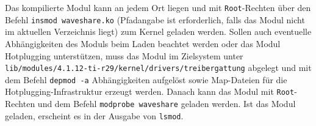 
Das kompilierte Modul kann an jedem Ort liegen und mit \texttt{Root}-Rechten über den Befehl \texttt{insmod waveshare.ko} (Pfadangabe ist erforderlich, falls das Modul nicht im aktuellen Verzeichnis liegt) zum Kernel geladen werden. Sollen auch eventuelle Abhängigkeiten des Moduls beim Laden beachtet werden oder das Modul Hotplugging unterstützen, muss das Modul im Zielsystem unter \texttt{lib/modules/4.1.12-ti-r29/kernel/drivers/treibergattung} abgelegt und mit dem Befehl \texttt{depmod -a} Abhängigkeiten aufgelöst sowie Map-Dateien für die Hotplugging-Infrastruktur erzeugt werden. %
Danach kann das Modul mit \texttt{Root}-Rechten und dem Befehl \texttt{modprobe waveshare} geladen werden. Ist das Modul geladen, erscheint es in der Ausgabe von \texttt{lsmod}. %





